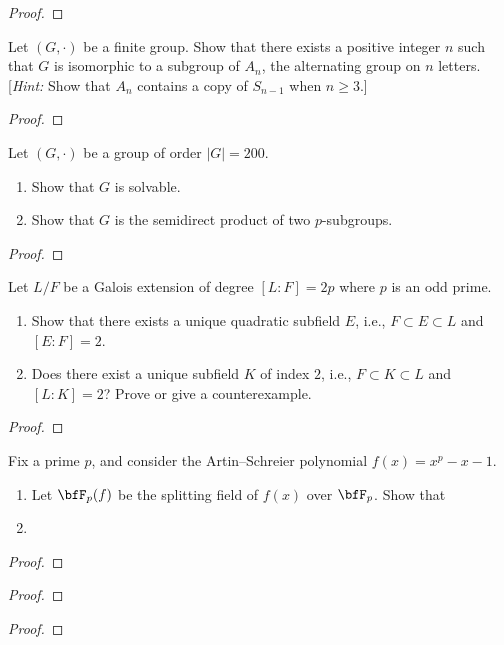 \begin{proof}
\end{proof}
\begin{problem}
Let $(G,\cdot)$ be a finite group. Show that there exists a positive
integer $n$ such that $G$ is isomorphic to a subgroup of $A_n$, the
alternating group on $n$ letters. [\emph{Hint:} Show that $A_n$ contains a
copy of $S_{n-1}$ when $n\geq 3$.]
\end{problem}
\begin{proof}
\end{proof}
\begin{problem}
Let $(G,\cdot)$ be a group of order $|G|=200$.
\begin{enumerate}[noitemsep,label=(\alph*)]
\item Show that $G$ is solvable.
\item Show that $G$ is the semidirect product of two $p$-subgroups.
\end{enumerate}
\end{problem}
\begin{proof}
\end{proof}
\begin{problem}
Let $L/F$ be a Galois extension of degree $[L:F]=2p$ where $p$ is an odd
prime.
\begin{enumerate}[noitemsep,label=(\alph*)]
\item Show that there exists a unique quadratic subfield $E$, i.e.,
  $F\subset E\subset L$ and $[E:F]=2$.
\item Does there exist a unique subfield $K$ of index $2$, i.e., $F\subset
  K\subset L$ and $[L:K]=2$? Prove or give a counterexample.
\end{enumerate}
\end{problem}
\begin{proof}
\end{proof}
\begin{problem}
Fix a prime $p$, and consider the Artin--Schreier polynomial
$f(x)=x^p-x-1$.
\begin{enumerate}[noitemsep,label=(\alph*)]
\item Let $\bfF_p(f)$ be the splitting field of $f(x)$ over $\bfF_p$. Show
  that $$
\item
\end{enumerate}
\end{problem}
\begin{proof}
\end{proof}
\begin{problem}
\end{problem}
\begin{proof}
\end{proof}
\begin{problem}
\end{problem}
\begin{proof}
\end{proof}

